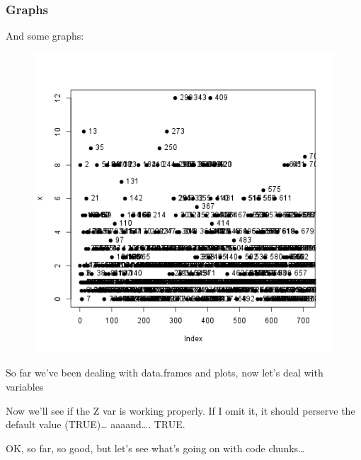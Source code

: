 \documentclass{article}
\makeatletter
\def\maxwidth{\ifdim\Gin@nat@width>\linewidth\linewidth
\else\Gin@nat@width\fi}
\let\Oldincludegraphics\includegraphics
\renewcommand{\includegraphics}[1]{\Oldincludegraphics[width=\maxwidth]{#1}}
\makeatother
\begin{document}
\subsubsection{Graphs}

And some graphs:

\begin{figure}[htbp]
\centering
\includegraphics{a28c9526df56f14f4db444f97f519855.png}
\caption{}
\end{figure}

So far we've been dealing with data.frames and plots, now let's deal
with variables

Now we'll see if the Z var is working properly. If I omit it, it should
perserve the default value (TRUE)\ldots{} aaaand\ldots{}. TRUE.

OK, so far, so good, but let's see what's going on with code
chunks\ldots{}
\end{document}
